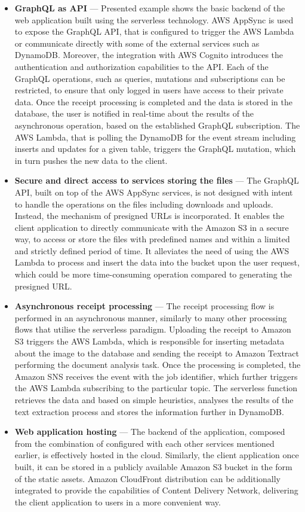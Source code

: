 \begin{itemize}
    \item \textbf{GraphQL as API} --- Presented example shows the basic backend of the web application built using the serverless technology. AWS AppSync is used to expose the GraphQL API, that is configured to trigger the AWS Lambda or communicate directly with some of the external services such as DynamoDB. Moreover, the integration with AWS Cognito introduces the authentication and authorization capabilities to the API. Each of the GraphQL operations, such as queries, mutations and subscriptions can be restricted, to ensure that only logged in users have access to their private data. Once the receipt processing is completed and the data is stored in the database, the user is notified in real-time about the results of the asynchronous operation, based on the established GraphQL subscription. The AWS Lambda, that is polling the DynamoDB for the event stream including inserts and updates for a given table, triggers the GraphQL mutation, which in turn pushes the new data to the client.
    \item \textbf{Secure and direct access to services storing the files} --- The GraphQL API, built on top of the AWS AppSync services, is not designed with intent to handle the operations on the files including downloads and uploads. Instead, the mechanism of presigned URLs is incorporated. It enables the client application to directly communicate with the Amazon S3 in a secure way, to access or store the files with predefined names and within a limited and strictly defined period of time. It alleviates the need of using the AWS Lambda to process and insert the data into the bucket upon the user request, which could be more time-consuming operation compared to generating the presigned URL.
    \item \textbf{Asynchronous receipt processing} --- The receipt processing flow is performed in an asynchronous manner, similarly to many other processing flows that utilise the serverless paradigm. Uploading the receipt to Amazon S3 triggers the AWS Lambda, which is responsible for inserting metadata about the image to the database and sending the receipt to Amazon Textract performing the document analysis task. Once the processing is completed, the Amazon SNS receives the event with the job identifier, which further triggers the AWS Lambda subscribing to the particular topic. The serverless function retrieves the data and based on simple heuristics, analyses the results of the text extraction process and stores the information further in DynamoDB.
    \item \textbf{Web application hosting} --- The backend of the application, composed from the combination of configured with each other services mentioned earlier, is effectively hosted in the cloud. Similarly, the client application once built, it can be stored in a publicly available Amazon S3 bucket in the form of the static assets. Amazon CloudFront distribution can be additionally integrated to provide the capabilities of Content Delivery Network, delivering the client application to users in a more convenient way.
\end{itemize}

